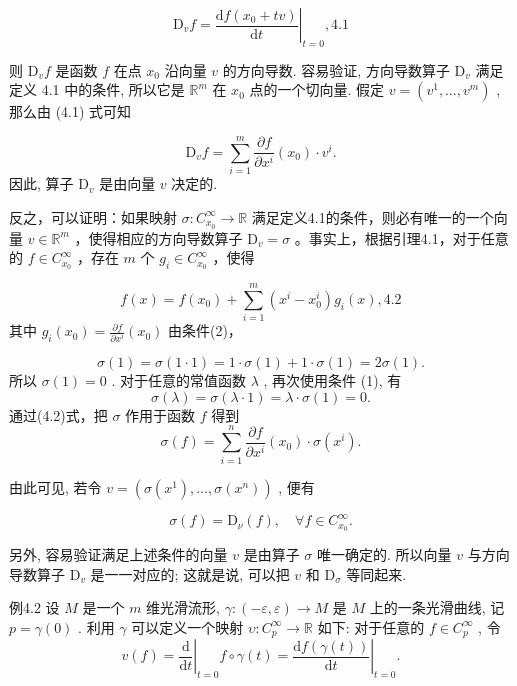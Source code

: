 $$
\mathrm {D} _ {v} f = \left. \frac {\mathrm {d} f \left(x _ {0} + t v\right)}{\mathrm {d} t} \right| _ {t = 0}, %
 {4.1}
$$

则  $\mathrm{D}_v f$  是函数  $f$  在点  $x_0$  沿向量  $v$  的方向导数. 容易验证, 方向导数算子  $\mathrm{D}_v$  满足定义 4.1 中的条件, 所以它是  $\mathbb{R}^m$  在  $x_0$  点的一个切向量. 假定  $v = (v^1, \dots, v^m)$ , 那么由 (4.1) 式可知

$$
\mathrm {D} _ {v} f = \sum_ {i = 1} ^ {m} \frac {\partial f}{\partial x ^ {i}} (x _ {0}) \cdot v ^ {i}.
$$
因此, 算子  $\mathrm{D}_v$  是由向量  $v$  决定的.

反之，可以证明：如果映射  $\sigma : C_{x_0}^{\infty} \to \mathbb{R}$  满足定义4.1的条件，则必有唯一的一个向量  $v \in \mathbb{R}^m$ ，使得相应的方向导数算子  $\mathrm{D}_v = \sigma$ 。事实上，根据引理4.1，对于任意的  $f \in C_{x_0}^{\infty}$ ，存在  $m$  个  $g_i \in C_{x_0}^{\infty}$ ，使得

$$
f (x) = f \left(x _ {0}\right) + \sum_ {i = 1} ^ {m} \left(x ^ {i} - x _ {0} ^ {i}\right) g _ {i} (x), %
 {4.2}
$$
其中  $g_{i}(x_{0}) = \frac{\partial f}{\partial x^{i}} (x_{0})$  由条件(2)，

$$
\sigma (1) = \sigma (1 \cdot 1) = 1 \cdot \sigma (1) + 1 \cdot \sigma (1) = 2 \sigma (1).
$$
所以  $\sigma(1) = 0$ . 对于任意的常值函数  $\lambda$ , 再次使用条件 (1), 有
$$
\sigma (\lambda) = \sigma (\lambda \cdot 1) = \lambda \cdot \sigma (1) = 0.
$$
通过(4.2)式，把  $\sigma$  作用于函数  $f$  得到
$$
\sigma (f) = \sum_ {i = 1} ^ {n} \frac {\partial f}{\partial x ^ {i}} (x _ {0}) \cdot \sigma (x ^ {i}).
$$

由此可见, 若令  $v = (\sigma(x^1), \dots, \sigma(x^n))$ , 便有

$$
\sigma (f) = \mathrm {D} _ {\nu} (f), \quad \forall f \in C _ {x _ {0}} ^ {\infty}.
$$

另外, 容易验证满足上述条件的向量  $v$  是由算子  $\sigma$  唯一确定的. 所以向量  $v$  与方向导数算子  $\mathrm{D}_v$  是一一对应的; 这就是说, 可以把  $v$  和  $\mathrm{D}_{\sigma}$  等同起来.

例4.2 设  $M$  是一个  $m$  维光滑流形,  $\gamma : (-\varepsilon, \varepsilon) \to M$  是  $M$  上的一条光滑曲线, 记  $p = \gamma(0)$ . 利用  $\gamma$  可以定义一个映射  $\upsilon : C_p^\infty \to \mathbb{R}$  如下: 对于任意的  $f \in C_p^\infty$ , 令
$$
v (f) = \left. \frac {\mathrm {d}}{\mathrm {d} t} \right| _ {t = 0} f \circ \gamma (t) = \left. \frac {\mathrm {d} f (\gamma (t))}{\mathrm {d} t} \right| _ {t = 0}.
$$

